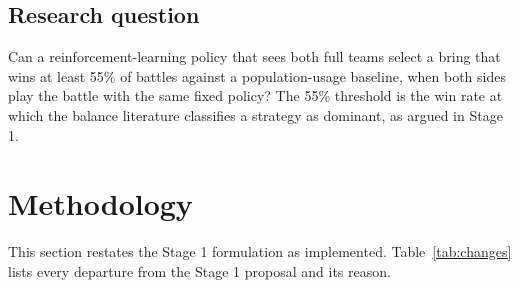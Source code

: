 \documentclass[conference]{IEEEtran}
\begin{document}
\subsection{Research question}
Can a reinforcement-learning policy that sees both full teams select a bring that wins at least 55\% of
battles against a population-usage baseline, when both sides play the battle with the same fixed policy?
The 55\% threshold is the win rate at which the balance literature classifies a strategy as dominant, as
argued in Stage 1.

\section{Methodology}
This section restates the Stage 1 formulation as implemented. Table~\ref{tab:changes} lists every
departure from the Stage 1 proposal and its reason.
\end{document}
